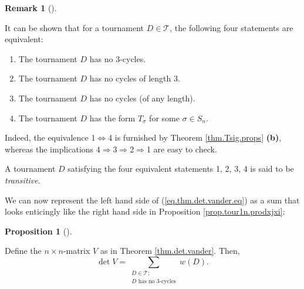 \documentclass[numbers=enddot,12pt,final,onecolumn,notitlepage]{scrartcl}%
\numberwithin{exer}{subsection}
\theoremstyle{definition}
\newtheorem{prop}[theo]{Proposition}
\newenvironment{proposition}[1][]
{\begin{prop}[#1]\begin{leftbar}}
{\end{leftbar}\end{prop}}
\newtheorem{remk}[theo]{Remark}
\newenvironment{remark}[1][]
{\begin{remk}[#1]\begin{leftbar}}
{\end{leftbar}\end{remk}}
\let\sumnonlimits\sum
\renewcommand{\sum}{\sumnonlimits\limits}
\begin{document}
\begin{remark}
It can be shown that for a tournament $D\in\mathcal{T}$, the following four
statements are equivalent:

\begin{enumerate}
\item The tournament $D$ has no $3$-cycles.

\item The tournament $D$ has no cycles of length $3$.

\item The tournament $D$ has no cycles (of any length).

\item The tournament $D$ has the form $T_{\sigma}$ for some $\sigma\in S_{n}$.
\end{enumerate}

Indeed, the equivalence 1$\Longleftrightarrow$4 is furnished by Theorem
\ref{thm.Tsig.props} \textbf{(b)}, whereas the implications 4$\Longrightarrow
$3$\Longrightarrow$2$\Longrightarrow$1 are easy to check.

A tournament $D$ satisfying the four equivalent statements 1, 2, 3, 4 is said
to be \emph{transitive}.
\end{remark}

We can now represent the left hand side of (\ref{eq.thm.det.vander.eq}) as a
sum that looks enticingly like the right hand side in Proposition
\ref{prop.tour1n.prodxjxi}:

\begin{proposition}
\label{prop.Tsig.Vassum}Define the $n\times n$-matrix $V$ as in Theorem
\ref{thm.det.vander}. Then,%
\[
\det V=\sum_{\substack{D\in\mathcal{T};\\D\text{ has no }3\text{-cycles}%
}}w\left(  D\right)  .
\]

\end{proposition}
\end{document}
